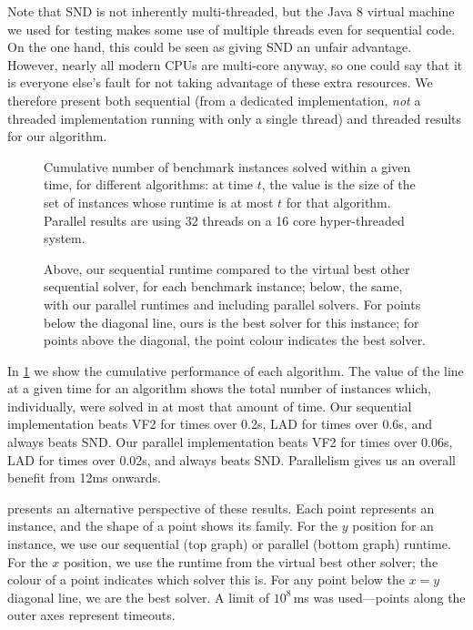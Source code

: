 \documentclass{llncs}
\begin{document}
Note that SND is not inherently multi-threaded, but the Java 8 virtual machine we used for testing
makes some use of multiple threads even for sequential code. On the one hand, this could be seen as
giving SND an unfair advantage. However, nearly all modern CPUs are multi-core anyway, so one could
say that it is everyone else's fault for not taking advantage of these extra resources. We therefore
present both sequential (from a dedicated implementation, \emph{not} a threaded implementation
running with only a single thread) and threaded results for our algorithm.

\begin{figure}[tb]
    \centering
    

    \caption{Cumulative number of benchmark instances solved within a given time, for different
    algorithms: at time $t$, the value is the size of the set of instances whose runtime is at most
    $t$ for that algorithm. Parallel results are using 32 threads on a 16 core hyper-threaded
    system.}
    \label{figure:cumulative}
\end{figure}

\begin{figure}[p]
    \centering
    

    \caption{Above, our sequential runtime compared to the virtual best other sequential solver,
        for each benchmark instance; below, the same, with our parallel runtimes and including
        parallel solvers. For points below the diagonal line, ours is the best solver for this
        instance; for points above the diagonal, the point colour indicates the best solver.}
    \label{figure:best-other}
\end{figure}

In \cref{figure:cumulative} we show the cumulative performance of each algorithm. The value of
the line at a given time for an algorithm shows the total number of instances which, individually,
were solved in at most that amount of time. Our sequential implementation beats VF2 for times over
0.2s, LAD for times over 0.6s, and always beats SND. Our parallel implementation beats VF2 for times
over 0.06s, LAD for times over 0.02s, and always beats SND. Parallelism gives us an overall benefit
from 12ms onwards.

 presents an alternative perspective of these results. Each point represents
an instance, and the shape of a point shows its family. For the $y$ position for an instance, we use
our sequential (top graph) or parallel (bottom graph) runtime. For the $x$ position, we use the
runtime from the virtual best other solver; the colour of a point indicates which solver this is.
For any point below the $x=y$ diagonal line, we are the best solver. A limit of $10^8$\,ms was
used---points along the outer axes represent timeouts.
\end{document}
